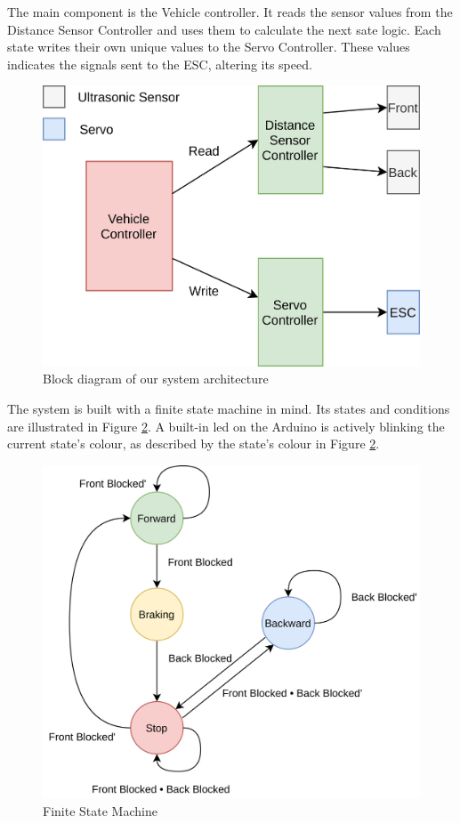 \documentclass{article}
\begin{document}
The main component is the Vehicle controller. It reads the sensor values from the Distance Sensor Controller and uses them to calculate the next sate logic. Each state writes their own unique values to the Servo Controller. These values indicates the signals sent to the ESC, altering its speed.

\begin{figure}[H]
	\centering
	\includegraphics[width=\linewidth]{system-architecture.png}
	\caption{Block diagram of our system architecture}
	\label{SystemArchBlock}
\end{figure}

The system is built with a finite state machine in mind. Its states and conditions are illustrated in Figure \ref{fsm}. A built-in led on the Arduino is actively blinking the current state's colour, as described by the state's colour in Figure \ref{fsm}.

\begin{figure}[H]
    \centering
    \includegraphics[width=\linewidth]{../presentation/img/finite-state-machine.png}
    \caption{Finite State Machine}
    \label{fsm}
\end{figure}
\end{document}
